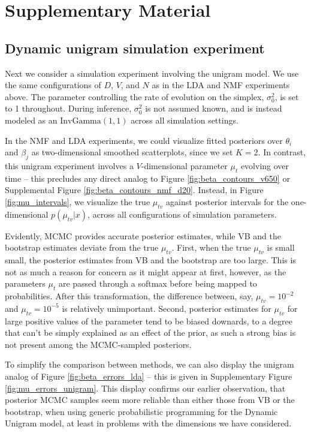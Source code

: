 \documentclass[oupdraft]{bio}
\begin{document}
\section{Supplementary Material}

\subsection{Dynamic unigram simulation experiment}
\label{subsec:dynamic_unigram_simulation}

Next we consider a simulation experiment involving the unigram model. We use the
same configurations of $D$, $V$, and $N$ as in the LDA and NMF experiments
above. The parameter controlling the rate of evolution on the simplex,
$\sigma_{0}^2$, is set to 1 throughout. During inference, $\sigma_0^2$ is not
assumed known, and is instead modeled as an $\text{InvGamma}\left(1, 1\right)$
across all simulation settings.

In the NMF and LDA experiments, we could visualize fitted posteriors over
$\theta_i$ and $\beta_j$ as two-dimensional smoothed scatterplots, since we set
$K = 2$. In contrast, this unigram experiment involves a $V$-dimensional
parameter $\mu_t$ evolving over time -- this precludes any direct analog to
Figure \ref{fig:beta_contours_v650} or Supplemental Figure
\ref{fig:beta_contours_nmf_d20}. Instead, in Figure \ref{fig:mu_intervals}, we
visualize the true $\mu_{tv}$ against posterior intervals for the
one-dimensional $p\left(\mu_{tv} \vert x\right)$, across all configurations of
simulation parameters.

Evidently, MCMC provides accurate posterior estimates, while VB and the
bootstrap estimates deviate from the true $\mu_{tv}$. First, when the true
$\mu_{tv}$ is small small, the posterior estimates from VB and the bootstrap are
too large. This is not as much a reason for concern as it might appear at first,
however, as the parameters $\mu_t$ are passed through a softmax before being
mapped to probabilities. After this transformation, the difference between, say,
$\mu_{tv} = 10^{-2}$ and $\mu_{tv} = 10^{-5}$ is relatively unimportant. Second,
posterior estimates for $\mu_{tv}$ for large positive values of the parameter
tend to be biased downards, to a degree that can't be simply explained as an
effect of the prior, as such a strong bias is not present among the MCMC-sampled
posteriors.

To simplify the comparison between methods, we can also display the unigram
analog of Figure \ref{fig:beta_errors_lda} -- this is given in Supplementary
Figure \ref{fig:mu_errors_unigram}. This display confirms our earlier
observation, that posterior MCMC samples seem more reliable than either those
from VB or the bootstrap, when using generic probabilistic programming for the
Dynamic Unigram model, at least in problems with the dimensions we have
considered.
\end{document}
